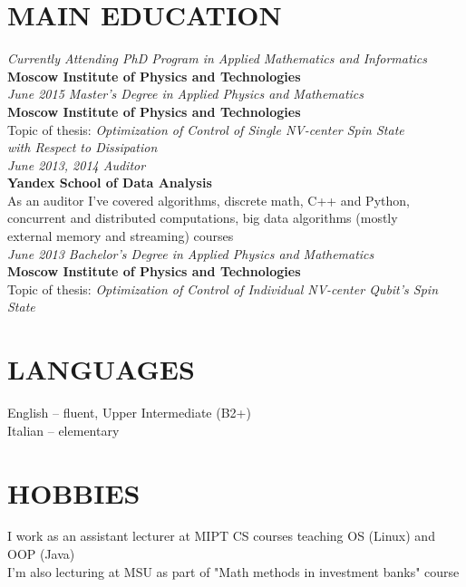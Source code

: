 \documentclass[margin,12pt]{res}
\begin{document}
\begin{resume}
\section{MAIN EDUCATION} 
\textit{Currently Attending PhD Program in Applied Mathematics and Informatics\\}
\textbf{Moscow Institute of Physics and Technologies}\\
\newline
\textit{June 2015 Master's Degree in Applied Physics and Mathematics\\}
\textbf{Moscow Institute of Physics and Technologies}\\
Topic of thesis: \textit{Optimization of Control of Single NV-center Spin State \\
with Respect to Dissipation}\\
\newline
\textit{June 2013, 2014 Auditor\\}
\textbf{Yandex School of Data Analysis}\\
As an auditor I've covered algorithms, discrete math, C++ and Python,\\
 concurrent and distributed computations, big data algorithms (mostly\\
 external memory and streaming) courses\\
\newline
\textit{June 2013 Bachelor's Degree in Applied Physics and Mathematics\\}
\textbf{Moscow Institute of Physics and Technologies}\\
Topic of thesis: \textit{Optimization of Control of Individual NV-center Qubit's Spin State}\\
\newline

\section{LANGUAGES} 
English -- fluent, Upper Intermediate (B2+)\\
Italian -- elementary

\section{HOBBIES}
I work as an assistant lecturer at MIPT CS courses teaching OS (Linux) and OOP (Java)\\
I'm also lecturing at MSU as part of "Math methods in investment banks" course

\end{resume}
\end{document}
